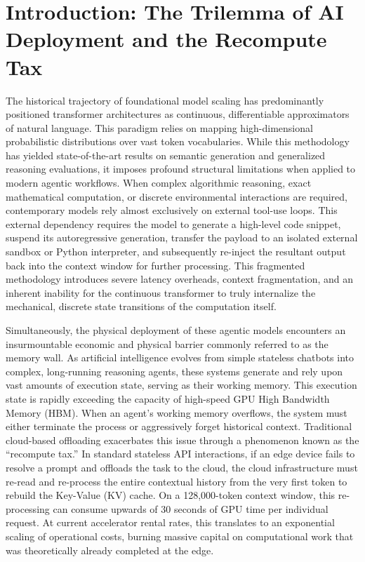 \documentclass[11pt,a4paper]{article}
\begin{document}
\section{Introduction: The Trilemma of AI Deployment and the Recompute Tax}

The historical trajectory of foundational model scaling has predominantly positioned transformer architectures as continuous, differentiable approximators of natural language. This paradigm relies on mapping high-dimensional probabilistic distributions over vast token vocabularies. While this methodology has yielded state-of-the-art results on semantic generation and generalized reasoning evaluations, it imposes profound structural limitations when applied to modern agentic workflows. When complex algorithmic reasoning, exact mathematical computation, or discrete environmental interactions are required, contemporary models rely almost exclusively on external tool-use loops. This external dependency requires the model to generate a high-level code snippet, suspend its autoregressive generation, transfer the payload to an isolated external sandbox or Python interpreter, and subsequently re-inject the resultant output back into the context window for further processing. This fragmented methodology introduces severe latency overheads, context fragmentation, and an inherent inability for the continuous transformer to truly internalize the mechanical, discrete state transitions of the computation itself.

Simultaneously, the physical deployment of these agentic models encounters an insurmountable economic and physical barrier commonly referred to as the memory wall. As artificial intelligence evolves from simple stateless chatbots into complex, long-running reasoning agents, these systems generate and rely upon vast amounts of execution state, serving as their working memory. This execution state is rapidly exceeding the capacity of high-speed GPU High Bandwidth Memory (HBM). When an agent's working memory overflows, the system must either terminate the process or aggressively forget historical context. Traditional cloud-based offloading exacerbates this issue through a phenomenon known as the ``recompute tax.'' In standard stateless API interactions, if an edge device fails to resolve a prompt and offloads the task to the cloud, the cloud infrastructure must re-read and re-process the entire contextual history from the very first token to rebuild the Key-Value (KV) cache. On a 128,000-token context window, this re-processing can consume upwards of 30 seconds of GPU time per individual request. At current accelerator rental rates, this translates to an exponential scaling of operational costs, burning massive capital on computational work that was theoretically already completed at the edge.
\end{document}
